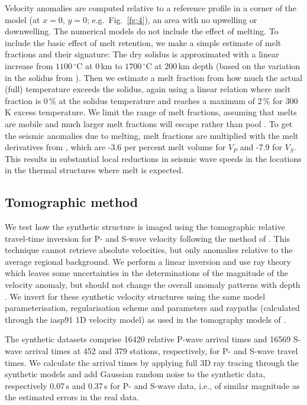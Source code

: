 \documentclass[a4paper,10pt,twocolumn]{paper}
\begin{document}
Velocity anomalies are computed relative to a reference profile in a corner of the model (at $x=0$, $y=0$; e.g.~Fig.~\ref{fg:4}), an area with no upwelling or downwelling. The numerical models do not include the effect of melting. To include the basic effect of melt retention, we make a simple estimate of melt fractions and their signature: The dry solidus is approximated with a linear increase from $1100\,^{\circ}$C at 0\,km to $1700\,^{\circ}$C at 200\,km depth (based on the variation in the solidus from \citealp{herzberg-etal-2000}). Then we estimate a melt fraction from how much the actual (full) temperature exceeds the solidus, again using a linear relation where melt fraction is 0\,\% at the solidus temperature and reaches a maximum of 2\,\% for 300\,K excess temperature. We limit the range of melt fractions, assuming that melts are mobile and much larger melt fractions will escape rather than pool \citep[e.g.][]{faul-etal-1994}. To get the seismic anomalies due to melting, melt fractions are multiplied with the melt derivatives from \cite{hammond-2000}, which are -3.6 per percent melt volume for $V_{P}$ and -7.9 for $V_{S}$. This results in substantial local reductions in seismic wave speeds in the locations in the thermal structures where melt is expected.

\subsection{Tomographic method}

We test how the synthetic structure is imaged using the tomographic relative travel-time inversion for P- and S-wave velocity following the method of \cite{vandecar-etal-1995}. This technique cannot retrieve absolute velocities, but only anomalies relative to the average regional background. We perform a linear inversion and use ray theory which leaves some uncertainties in the determinations of the magnitude of the velocity anomaly, but should not change the overall anomaly patterns with depth \citep{montelli-etal-2004b}. We invert for these synthetic velocity structures using the same model parameterisation, regularisation scheme and parameters and raypaths (calculated through the iasp91 1D velocity model) as used in the tomography models of \cite{civiero-etal-2016,civiero-etal-2015}.

The synthetic datasets comprise 16420 relative P-wave arrival times and 16569 S-wave arrival times at 452 and 379 stations, respectively, for P- and S-wave travel times. We calculate the arrival times by applying full 3D ray tracing \citep{julian-1977} through the synthetic models and add Gaussian random noise to the synthetic data, respectively 0.07\,s and 0.37\,s for P- and S-wave data, i.e., of similar magnitude as the estimated errors in the real data.
\end{document}
